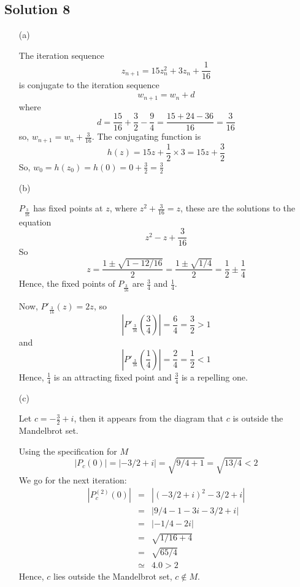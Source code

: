 \subsection*{Solution 8}

\begin{itemize}
\item[(a)]

The iteration sequence
\[
z_{n+1} = 15z_n^2 + 3z_n + \frac{1}{16}
\]
is conjugate to the iteration sequence
\[
w_{n+1} = w_n+d
\]
where
\[
d = \frac{15}{16} + \frac{3}{2} - \frac{9}{4} = \frac{15+24-36}{16} = \frac{3}{16}
\]
so, $w_{n+1} = w_n+\frac{3}{16}$.
The conjugating function is
\[
h(z) = 15z+\frac{1}{2}\times3 = 15z+\frac{3}{2}
\]
So, $w_0 = h(z_0) = h(0) = 0+\frac{3}{2} = \frac{3}{2}$

\item[(b)]

$P_{\frac{3}{16}}$ has fixed points at $z$, where $z^2+\frac{3}{16}=z$, these are the solutions to the equation
\[
z^2-z+\frac{3}{16}
\]
So
\[
z = \frac{ 1 \pm \sqrt{1 - 12/16} }{ 2 } = \frac{ 1 \pm \sqrt{1/4} }{ 2 } = \frac{1}{2}\pm\frac{1}{4}
\]
Hence, the fixed points of $P_{\frac{3}{16}}$ are $\frac{3}{4}$ and $\frac{1}{4}$.

Now, $P'_{\frac{3}{16}}(z) = 2z$, so
\[ \left|P'_{\frac{3}{16}}\left(\frac{3}{4}\right)\right| = \frac{6}{4} = \frac{3}{2} > 1 \]
and
\[ \left|P'_{\frac{3}{16}}\left(\frac{1}{4}\right)\right| = \frac{2}{4} = \frac{1}{2} < 1 \]
Hence, $\frac{1}{4}$ is an attracting fixed point and $\frac{3}{4}$ is a repelling one.

\item[(c)]

Let $c=-\frac{3}{2}+i$, then it appears from the diagram that $c$ is
outside the Mandelbrot set.

Using the specification for $M$
\[
|P_c(0)| = |-3/2+i| = \sqrt{9/4+1} = \sqrt{13/4} < 2
\]
We go for the next iteration:
\begin{eqnarray*}
|P_c^{(2)}(0)|
	&=& |(-3/2+i)^2-3/2+i| \\
	&=& |9/4-1-3i-3/2+i| \\
	&=& |-1/4-2i| \\
	&=& \sqrt{1/16+4} \\
	&=& \sqrt{65/4} \\
	&\simeq& 4.0 > 2
\end{eqnarray*}
Hence, $c$ lies outside the Mandelbrot set, $c\not\in M$.

\end{itemize}

